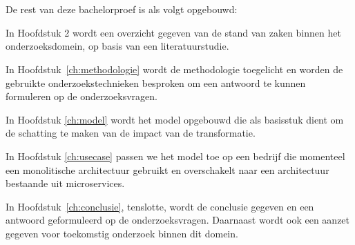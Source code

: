 \section{}
\label{sec:opzet-bachelorproef}


De rest van deze bachelorproef is als volgt opgebouwd:

In Hoofdstuk 2 wordt een overzicht gegeven van de stand van zaken binnen het onderzoeksdomein, op basis van een literatuurstudie.

In Hoofdstuk~\ref{ch:methodologie} wordt de methodologie toegelicht en worden de gebruikte onderzoekstechnieken besproken om een antwoord te kunnen formuleren op de onderzoeksvragen.

In Hoofdstuk \ref{ch:model} wordt het model opgebouwd die als basisstuk dient om de schatting te maken van de impact van de transformatie.

In Hoofdstuk \ref{ch:usecase} passen we het model toe op een bedrijf die momenteel een monolitische architectuur gebruikt en overschakelt naar een architectuur bestaande uit microservices.


In Hoofdstuk~\ref{ch:conclusie}, tenslotte, wordt de conclusie gegeven en een antwoord geformuleerd op de onderzoeksvragen. Daarnaast wordt ook een aanzet gegeven voor toekomstig onderzoek binnen dit domein.